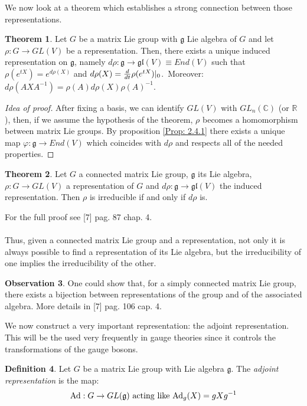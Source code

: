 \documentclass[12pt,a4paper]{report}
\theoremstyle{definition}
\newtheorem{Def}{Definition}[chapter]
\theoremstyle{Theorem}
\newtheorem{Theo}[Def]{Theorem}
\theoremstyle{definition}
\theoremstyle{definition}
\newtheorem{Obs}[Def]{Observation}
\begin{document}
	We now look at a theorem which establishes a strong connection between those representations.
	\begin{Theo}
		Let $G$ be a matrix Lie group with $\mathfrak{g}$ Lie algebra of $G$ and let $\rho:G\rightarrow GL(V)$ be a representation. Then, there exists a unique induced representation on $\mathfrak{g}$, namely $d\rho:\mathfrak{g}\rightarrow \mathfrak{gl}(V)\equiv End(V)$ such that $\rho(e^{tX})=e^{d\rho(X)}$ and $d\rho(X)={d\over dt}\rho(e^{tX})|_0$.\
		Moreover: $d\rho(AXA^{-1})=\rho(A)d\rho(X)\rho(A)^{-1}$.	
	\end{Theo}
	\begin{proof} [Idea of proof]
		After fixing a basis, we can identify $GL(V)$ with $GL_n(\mathbb{C})$ (or $\mathbb{R}$), then, if we assume the hypothesis of the theorem, $\rho$ becomes a homomorphism between matrix Lie groups. By proposition \ref{Prop: 2.4.1} there exists a unique map $\varphi:\mathfrak{g}\rightarrow End(V)$ which coincides with $d\rho$ and respects all of the needed properties.
	\end{proof}
	\begin{Theo}\label{Theo: 3.1}
		Let $G$ a connected matrix Lie group, $\mathfrak{g}$ its Lie algebra, $\rho:G\rightarrow GL(V)$ a representation of $G$ and $d\rho:\mathfrak{g}\rightarrow \mathfrak{gl}(V)$ the induced representation. Then $\rho$ is irreducible if and only if $d\rho$ is.
	\end{Theo}
	For the full proof see [7] pag. 87 chap. 4.\\
	\\
	Thus, given a connected matrix Lie group and a representation, not only it is always possible to find a representation of its Lie algebra, but the irreducibility of one implies the irreducibility of the other.
	\begin{Obs}
		One could show that, for a simply connected matrix Lie group, there exists a bijection between representations of the group and of the associated algebra. More details in [7] pag. 106 cap. 4.
	\end{Obs}
	We now construct a very important representation: the adjoint representation. This will be the used very frequently in gauge theories since it controls the transformations of the gauge bosons.
	\begin{Def}
		Let $G$ be a matrix Lie group with Lie algebra $\mathfrak{g}$. The \textit{adjoint representation} is the map:
		$$\hbox{Ad}:G\rightarrow GL(\mathfrak{g})\hbox{ acting like } \hbox{Ad}_g(X)=gXg^{-1}$$
	\end{Def}
\end{document}
